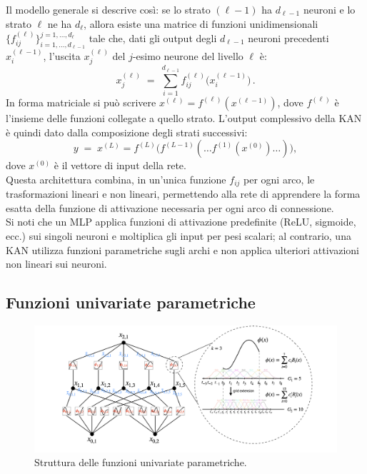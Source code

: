 \documentclass[a4paper,12pt]{report}
\begin{document}
	Il modello generale si descrive così: se lo strato $(\ell-1)$ ha $d_{\ell-1}$ neuroni e lo strato $\ell$ ne ha $d_\ell$, allora esiste una matrice di funzioni unidimensionali $\{f^{(\ell)}_{ij}\}_{i=1,\dots,d_{\ell-1}}^{j=1,\dots,d_\ell}$ tale che, dati gli output degli $d_{\ell-1}$ neuroni precedenti $x_i^{(\ell-1)}$, l’uscita $x_j^{(\ell)}$ del $j$-esimo neurone del livello $\ell$ è: 
	\[
	x_j^{(\ell)} \;=\; \sum_{i=1}^{d_{\ell-1}} f^{(\ell)}_{ij}\bigl(x_i^{(\ell-1)}\bigr)\,.
	\] 
	In forma matriciale si può scrivere $x^{(\ell)} = f^{(\ell)}(x^{(\ell-1)})$, dove $f^{(\ell)}$ è l’insieme delle funzioni collegate a quello strato. L’output complessivo della KAN è quindi dato dalla composizione degli strati successivi: 
	\[
	y \;=\; x^{(L)} 
	= f^{(L)}\bigl(f^{(L-1)}(\dots f^{(1)}(x^{(0)})\dots)\bigr)\!,
	\] 
	dove $x^{(0)}$ è il vettore di input della rete. \\
	Questa architettura combina, in un’unica funzione $f_{ij}$ per ogni arco, le trasformazioni lineari e non lineari, permettendo alla rete di apprendere la forma esatta della funzione di attivazione necessaria per ogni arco di connessione. \\
	Si noti che un MLP applica funzioni di attivazione predefinite (ReLU, sigmoide, ecc.) sui singoli neuroni e moltiplica gli input per pesi scalari; al contrario, una KAN utilizza funzioni parametriche sugli archi e non applica ulteriori attivazioni non lineari sui neuroni.
	
	\subsection{Funzioni univariate parametriche}
	
	\begin{figure}[H]
		\centering
		\includegraphics[width=1.0\textwidth]{img/fup.png}
		\caption{Struttura delle funzioni univariate parametriche.}
	\end{figure}
	
\end{document}
